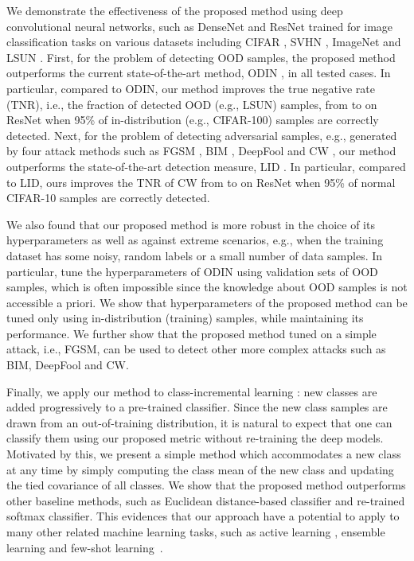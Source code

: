 \documentclass{article}
\begin{document}
We demonstrate the effectiveness of the proposed method using deep convolutional neural networks,
such as DenseNet \citep{huang2017densely} and ResNet \citep{he2016deep} trained for image classification tasks on various datasets including CIFAR \citep{krizhevsky2009learning}, SVHN \citep{netzer2011reading}, ImageNet \citep{deng2009imagenet} and LSUN \citep{yu2015lsun}.
First, for the problem of detecting OOD samples, the proposed method 
outperforms the current state-of-the-art method, ODIN \citep{liang2017principled}, 
in all tested cases.
In particular, compared to ODIN,
our method improves the true negative rate (TNR), i.e., the fraction of detected OOD (e.g., LSUN) samples,
from  to  on ResNet when 95\% of in-distribution (e.g., CIFAR-100) samples are correctly detected.
Next, for the problem of detecting adversarial samples, e.g., generated by four attack methods such as FGSM \citep{goodfellow2014explaining}, BIM \citep{kurakin2016adversarial}, DeepFool \citep{moosavi2016deepfool} and CW \citep{carlini2017adversarial},
our method outperforms the state-of-the-art detection measure, LID \citep{ma2018characterizing}.
In particular, compared to LID,
ours improves the TNR of CW from  to  on ResNet when 95\% of normal CIFAR-10 samples are correctly detected.

We also found that our proposed method is more robust in the choice of its hyperparameters as well as against extreme scenarios, e.g., when the training dataset has 
some noisy, random labels or a small number of data samples.
In particular, \citet{liang2017principled} tune the hyperparameters of ODIN using validation sets of OOD samples, which is often impossible since the knowledge about OOD samples is not accessible a priori.
We show that hyperparameters of
the proposed method can be tuned only using in-distribution (training) samples, while maintaining its performance. We further show that the proposed method tuned on a simple attack, i.e., FGSM, can be used to detect other more complex attacks such as BIM, DeepFool and CW.



Finally, we apply our method to class-incremental learning \citep{rebuffi2017icarl}: new classes are added progressively to a pre-trained classifier.
Since the new class samples are drawn from an out-of-training distribution,
it is natural to expect that one can classify them using our proposed metric without re-training the deep models.
Motivated by this,
we present a simple method which accommodates a new class at any time by simply computing the class mean of the new class and updating the tied covariance of all classes.
We show that the proposed method outperforms other baseline methods,
such as Euclidean distance-based classifier and re-trained softmax classifier.
This evidences that our approach have a potential to apply to many other related machine learning tasks, such as active learning \citep{gal2017deep}, ensemble learning \citep{lee2017confident} and few-shot learning~\citep{vinyals2016matching}.
\end{document}
